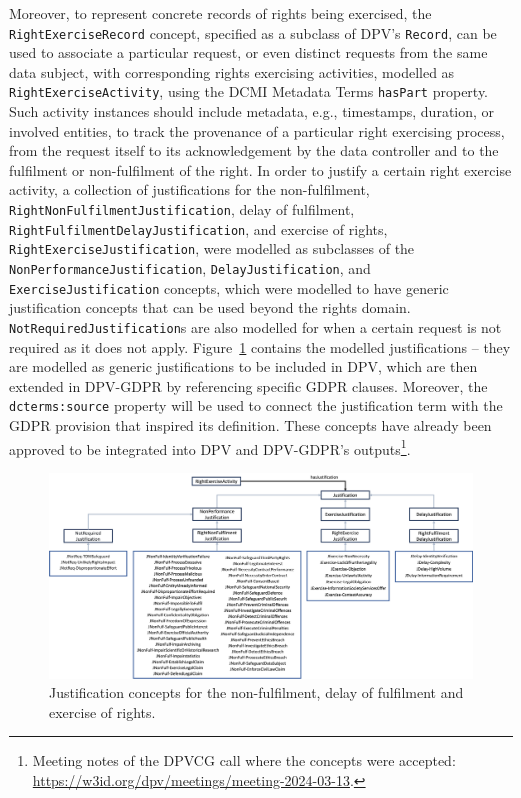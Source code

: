 Moreover, to represent concrete records of rights being exercised, the \texttt{RightExerciseRecord} concept, specified as a subclass of DPV's \texttt{Record}, can be used to associate a particular request, or even distinct requests from the same data subject, with corresponding rights exercising activities, modelled as \texttt{RightExerciseActivity}, using the DCMI Metadata Terms \texttt{hasPart} property.
Such activity instances should include metadata, e.g., timestamps, duration, or involved entities, to track the provenance of a particular right exercising process, from the request itself to its acknowledgement by the data controller and to the fulfilment or non-fulfilment of the right.
In order to justify a certain right exercise activity, a collection of justifications for the non-fulfilment, \texttt{RightNonFulfilmentJustification}, delay of fulfilment, \texttt{RightFulfilmentDelayJustification}, and exercise of rights, \texttt{RightExerciseJustification}, were modelled as subclasses of the \texttt{NonPerformanceJustification}, \texttt{DelayJustification}, and \texttt{ExerciseJustification} concepts, which were modelled to have generic justification concepts that can be used beyond the rights domain.
\texttt{NotRequiredJustification}s are also modelled for when a certain request is not required as it does not apply. 
Figure~\ref{fig:justifications} contains the modelled justifications -- they are modelled as generic justifications to be included in DPV, which are then extended in DPV-GDPR by referencing specific GDPR clauses.
Moreover, the \texttt{dcterms:source} property will be used to connect the justification term with the GDPR provision that inspired its definition. 
These concepts have already been approved to be integrated into DPV and DPV-GDPR's outputs\footnote{Meeting notes of the DPVCG call where the concepts were accepted: \url{https://w3id.org/dpv/meetings/meeting-2024-03-13}.}.

\begin{figure}[ht]
    \centering
    \includegraphics[width=\linewidth]{figures/chapter-4/justifications.png}
    \caption{Justification concepts for the non-fulfilment, delay of fulfilment and exercise of rights.}
    \label{fig:justifications}
\end{figure}

